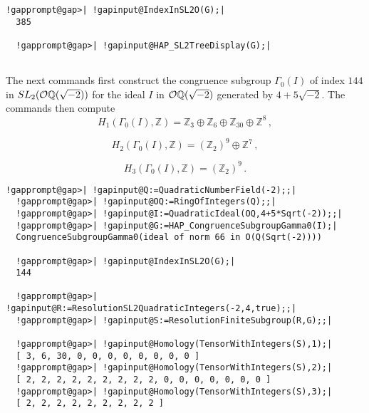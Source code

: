 \documentclass[a4paper,11pt]{report}
\begin{document}
{{\begin{Verbatim}[commandchars=!@|,fontsize=\small,frame=single,label=Example]
  !gapprompt@gap>| !gapinput@IndexInSL2O(G);|
  385
   
  !gapprompt@gap>| !gapinput@HAP_SL2TreeDisplay(G);|
  
\end{Verbatim}
  

The next commands first construct the congruence subgroup $\Gamma_0(I)$ of index $144$ in $SL_2({\cal O}\mathbb Q(\sqrt{-2}))$ for the ideal $I$ in ${\cal O}\mathbb Q(\sqrt{-2})$ generated by $4+5\sqrt{-2}$. The commands then compute 
\[H_1(\Gamma_0(I),\mathbb Z) = \mathbb Z_3 \oplus \mathbb Z_6 \oplus \mathbb
Z_{30} \oplus \mathbb Z^8\, ,\]
 
\[H_2(\Gamma_0(I), \mathbb Z) = (\mathbb Z_2)^9 \oplus \mathbb Z^7\, ,\]
 
\[H_3(\Gamma_0(I), \mathbb Z) = (\mathbb Z_2)^9 \, .\]
 
\begin{Verbatim}[commandchars=!@|,fontsize=\small,frame=single,label=Example]
  !gapprompt@gap>| !gapinput@Q:=QuadraticNumberField(-2);;|
  !gapprompt@gap>| !gapinput@OQ:=RingOfIntegers(Q);;|
  !gapprompt@gap>| !gapinput@I:=QuadraticIdeal(OQ,4+5*Sqrt(-2));;|
  !gapprompt@gap>| !gapinput@G:=HAP_CongruenceSubgroupGamma0(I);|
  CongruenceSubgroupGamma0(ideal of norm 66 in O(Q(Sqrt(-2)))) 
  
  !gapprompt@gap>| !gapinput@IndexInSL2O(G);|
  144
  
  !gapprompt@gap>| !gapinput@R:=ResolutionSL2QuadraticIntegers(-2,4,true);;|
  !gapprompt@gap>| !gapinput@S:=ResolutionFiniteSubgroup(R,G);;|
  
  !gapprompt@gap>| !gapinput@Homology(TensorWithIntegers(S),1);|
  [ 3, 6, 30, 0, 0, 0, 0, 0, 0, 0, 0 ]
  !gapprompt@gap>| !gapinput@Homology(TensorWithIntegers(S),2);|
  [ 2, 2, 2, 2, 2, 2, 2, 2, 2, 0, 0, 0, 0, 0, 0, 0 ]
  !gapprompt@gap>| !gapinput@Homology(TensorWithIntegers(S),3);|
  [ 2, 2, 2, 2, 2, 2, 2, 2, 2 ]
  
\end{Verbatim}
 }

 
}
\end{document}
